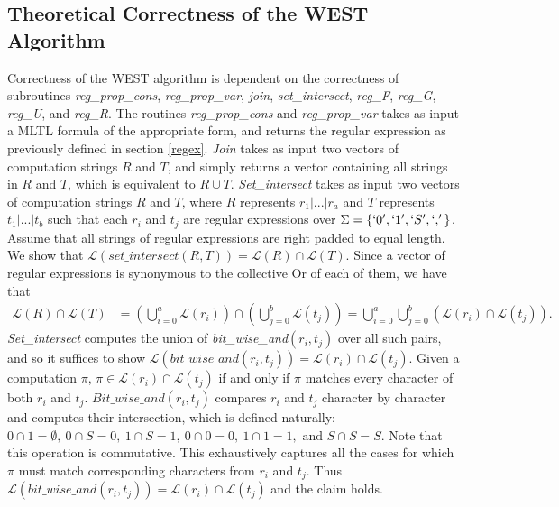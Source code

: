 \documentclass[runningheads]{llncs}
\begin{document}
\subsection{Theoretical Correctness of the WEST Algorithm}
 Correctness of the WEST algorithm is dependent on the correctness of subroutines \textit{reg\_prop\_cons}, \textit{reg\_prop\_var}, \textit{join}, \textit{set\_intersect}, \textit{reg\_F}, \textit{reg\_G}, \textit{reg\_U}, and \textit{reg\_R}. 
The routines \textit{reg\_prop\_cons} and \textit{reg\_prop\_var} takes as input a MLTL formula of the appropriate form, and returns the regular expression as previously defined in section \ref{regex}.
\textit{Join} takes as input two vectors of computation strings $R$ and $T$, and simply returns a vector containing all strings in $R$ and $T$, which is equivalent to $R \cup T$. 
\textit{Set\_intersect} takes as input two vectors of computation strings $R$ and $T$, where $R$ represents $r_1 | ... | r_a$ and $T$ represents $t_1 | ... | t_b$ such that each $r_i$ and $t_j$ are regular expressions over $\Sigma = \{`0', `1', `S', `,'\}$. Assume that all strings of regular expressions are right padded to equal length. We show that $\mathscr{L}(\textit{set\_intersect}(R, T)) = \mathscr{L}(R) \cap \mathscr{L}(T)$. Since a vector of regular expressions is synonymous to the collective Or of each of them, we have that 
\begin{align*}
    \mathscr{L}(R) \cap \mathscr{L}(T) &= \left(\bigcup_{i = 0}^a \mathscr{L}(r_i) \right)\cap \left( \bigcup_{j = 0}^b \mathscr{L}(t_j)\right) = \bigcup_{i = 0}^a \bigcup_{j = 0}^b \left(\mathscr{L}(r_i) \cap \mathscr{L}(t_j)\right).
\end{align*}
\textit{Set\_intersect} computes the union of \textit{bit\_wise\_and}$(r_i, t_j)$ over all such pairs, and so it suffices to show $\mathscr{L}(\textit{bit\_wise\_and}(r_i, t_j)) = \mathscr{L}(r_i) \cap \mathscr{L}(t_j)$.  Given a computation $\pi$, $\pi \in \mathscr{L}(r_i) \cap \mathscr{L}(t_j)$ if and only if $\pi$ matches every character of both $r_i$ and $t_j$. $\textit{Bit\_wise\_and}(r_i, t_j)$ compares $r_i$ and $t_j$ character by character and computes their intersection, which is defined naturally: $0 \cap 1 = \emptyset,\ 0 \cap S = 0,\ 1 \cap S = 1, \ 0 \cap 0 = 0, \ 1 \cap 1= 1,\text{ and } S \cap S = S$. Note that this operation is commutative. This exhaustively captures all the cases for which $\pi$ must match corresponding characters from $r_i$ and $t_j$. Thus $\mathscr{L}(\textit{bit\_wise\_and}(r_i, t_j)) = \mathscr{L}(r_i) \cap \mathscr{L}(t_j)$ and the claim holds.
\end{document}
